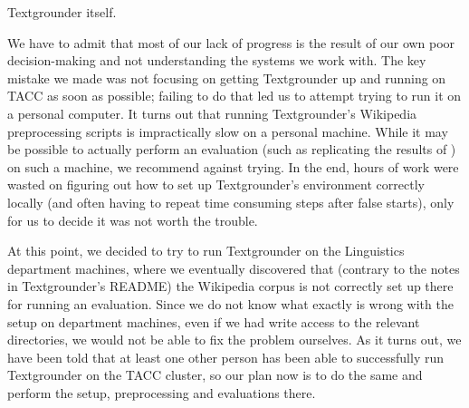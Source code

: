 Textgrounder itself.
\par
We have to admit that most of our lack of progress is the result of our own
poor decision-making and not understanding the systems we work with.
The key mistake we made was not focusing on getting Textgrounder up and running
on TACC as soon as possible; failing to do that led us to
attempt trying to run it on a personal computer.
It turns out that running Textgrounder's Wikipedia preprocessing scripts is
impractically slow on a personal machine. While it may be possible to actually
perform an evaluation (such as replicating the results of \cite{rolleretal:12})
on such a machine, we recommend against trying.
In the end, hours of work were wasted on figuring out how to set up
Textgrounder's environment correctly locally (and often having to repeat time consuming
steps after false starts), only for us to decide it was not worth the trouble.
\par
At this point, we decided to try to run Textgrounder on the Linguistics
department machines, where we eventually discovered that (contrary to the notes
in Textgrounder's README) the Wikipedia corpus is not correctly set up
there for running an evaluation.
Since we do not know what exactly is wrong with the setup on department machines, even if we had write
access to the relevant directories, we would not be able to fix the problem
ourselves.
As it turns out, we have been told that at least one other person
has been able to successfully run Textgrounder on the TACC cluster, so our plan
now is to do the same and perform the setup, preprocessing and evaluations there.
